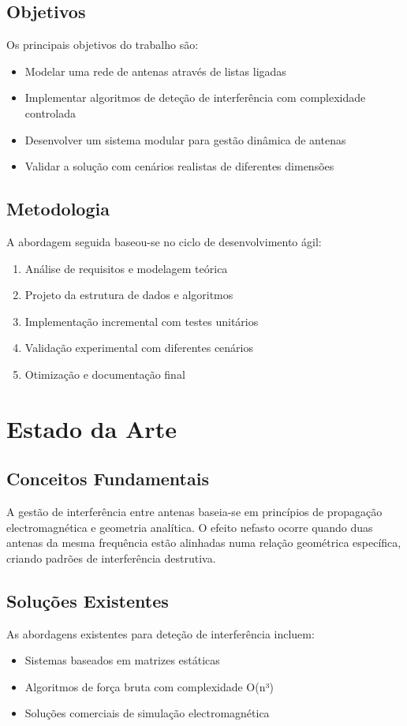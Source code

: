 \documentclass[a4paper,12pt]{report}
\begin{document}
\section{Objetivos}
Os principais objetivos do trabalho são:
\begin{itemize}
    \item Modelar uma rede de antenas através de listas ligadas
    \item Implementar algoritmos de deteção de interferência com complexidade controlada
    \item Desenvolver um sistema modular para gestão dinâmica de antenas
    \item Validar a solução com cenários realistas de diferentes dimensões
\end{itemize}

\section{Metodologia}
A abordagem seguida baseou-se no ciclo de desenvolvimento ágil:
\begin{enumerate}
    \item Análise de requisitos e modelagem teórica
    \item Projeto da estrutura de dados e algoritmos
    \item Implementação incremental com testes unitários
    \item Validação experimental com diferentes cenários
    \item Otimização e documentação final
\end{enumerate}

\chapter{Estado da Arte}
\section{Conceitos Fundamentais}
A gestão de interferência entre antenas baseia-se em princípios de propagação electromagnética e geometria analítica. O efeito nefasto ocorre quando duas antenas da mesma frequência estão alinhadas numa relação geométrica específica, criando padrões de interferência destrutiva.

\section{Soluções Existentes}
As abordagens existentes para deteção de interferência incluem:
\begin{itemize}
    \item Sistemas baseados em matrizes estáticas
    \item Algoritmos de força bruta com complexidade O(n³)
    \item Soluções comerciais de simulação electromagnética
\end{itemize}
\end{document}
